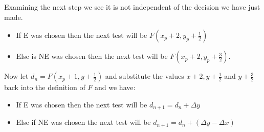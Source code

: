 \documentclass{article}
\begin{document}
Examining the next step we see it is not independent of the decision we have just made.
\begin{itemize}
	\item If E was chosen then the next test will be $F(x_p+2,y_p+\frac{1}{2})$
	\item Else is NE was chosen then the next test will be $F(x_p + 2, y_p + \frac{3}{2})$.
\end{itemize}
Now let $d_n = F(x_p + 1, y + \frac{1}{2})$ and substitute the values $x+2, y+\frac{1}{2}$ and $y+\frac{3}{2}$ back into the definition of $F$ and we have:
\begin{itemize}
	\item If E was chosen then the next test will be $d_{n+1} = d_n+\Delta y$
	\item Else if NE was chosen the next test will be $d_{n+1} = d_n + (\Delta y - \Delta x)$
\end{itemize}
\end{document}
